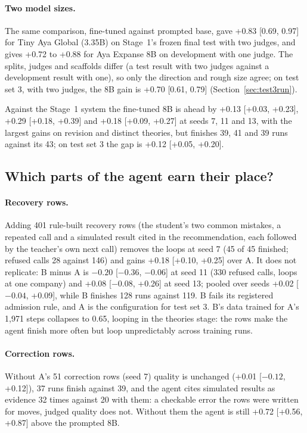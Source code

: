 \documentclass[11pt]{article}
\begin{document}
\paragraph{Two model sizes.} The same comparison, fine-tuned against prompted base, gave +0.83 [0.69, 0.97] for Tiny
Aya Global (3.35B) on Stage~1's frozen final test with two judges, and gives +0.72 to +0.88 for Aya Expanse 8B
on development with one judge. The splits, judges and scaffolds differ (a test result with two judges against a development
result with one), so only the direction and rough size agree; on test set 3, with two judges, the 8B
gain is +0.70 [0.61, 0.79] (Section~\ref{sec:test3run}).

Against the Stage~1 system the fine-tuned 8B is ahead by +0.13 [+0.03, +0.23], +0.29 [+0.18, +0.39] and +0.18
[+0.09, +0.27] at seeds 7, 11 and 13, with the largest gains on revision and distinct theories, but finishes 39, 41 and
39 runs against its 43; on test set 3 the gap is +0.12 [+0.05, +0.20].

\subsection{Which parts of the agent earn their place?}
\label{sec:parts}

\paragraph{Recovery rows.} Adding 401 rule-built recovery rows (the student's two common mistakes, a repeated call
and a simulated result cited in the recommendation, each followed by the teacher's own next call) removes the loops at
seed 7 (45 of 45 finished; refused calls 28 against 146) and gains +0.18 [+0.10, +0.25] over A. It does not replicate:
B minus A is $-0.20$ [$-0.36$, $-0.06$] at seed 11 (330 refused calls, loops at one company) and +0.08 [$-0.08$, +0.26]
at seed 13; pooled over seeds +0.02 [$-0.04$, +0.09], while B finishes 128 runs against 119. B fails its registered
admission rule, and A is the configuration for test set 3. B's data trained for A's 1,971 steps collapses to 0.65,
looping in the theories stage: the rows make the agent finish more often but loop unpredictably across training runs.

\paragraph{Correction rows.} Without A's 51 correction rows (seed 7) quality is unchanged (+0.01 [$-0.12$, +0.12]),
37 runs finish against 39, and the agent cites simulated results as evidence 32 times against 20 with them: a
checkable error the rows were written for moves, judged quality does not. Without them the agent is still +0.72
[+0.56, +0.87] above the prompted 8B.
\end{document}

